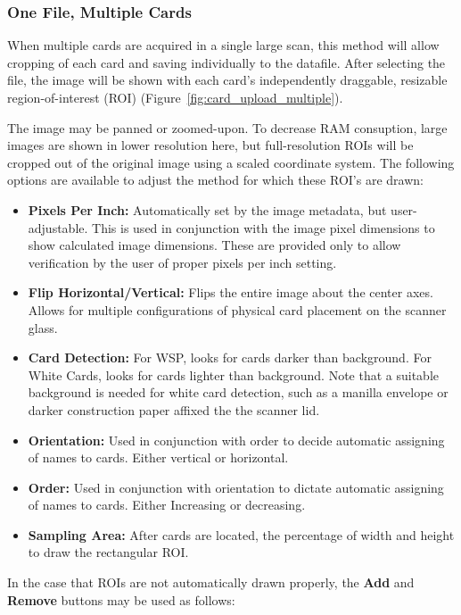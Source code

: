 \documentclass[10pt,letterpaper,titlepage]{article}
\begin{document}
    \subsubsection{One File, Multiple Cards}
    When multiple cards are acquired in a single large scan, this method will allow cropping of each card and saving individually to the datafile. After selecting the file, the image will be shown with each card's independently draggable, resizable region-of-interest (ROI) (Figure~\ref{fig:card_upload_multiple}).\par 
    The image may be panned or zoomed-upon. To decrease RAM consuption, large images are shown in lower resolution here, but full-resolution ROIs will be cropped out of the original image using a scaled coordinate system. The following options are available to adjust the method for which these ROI's are drawn:
    \begin{itemize}
        \item \textbf{Pixels Per Inch:} Automatically set by the image metadata, but user-adjustable. This is used in conjunction with the image pixel dimensions to show calculated image dimensions. These are provided only to allow verification by the user of proper pixels per inch setting.
        \item \textbf{Flip Horizontal/Vertical:} Flips the entire image about the center axes. Allows for multiple configurations of physical card placement on the scanner glass. 
        \item \textbf{Card Detection:} For WSP, looks for cards darker than background. For White Cards, looks for cards lighter than background. Note that a suitable background is needed for white card detection, such as a manilla envelope or darker construction paper affixed the the scanner lid.
        \item \textbf{Orientation:} Used in conjunction with order to decide automatic assigning of names to cards. Either vertical or horizontal.
        \item \textbf{Order:} Used in conjunction with orientation to dictate automatic assigning of names to cards. Either Increasing or decreasing.
        \item \textbf{Sampling Area:} After cards are located, the percentage of width and height to draw the rectangular ROI.
    \end{itemize}
    In the case that ROIs are not automatically drawn properly, the \textbf{Add} and \textbf{Remove} buttons may be used as follows:
\end{document}
